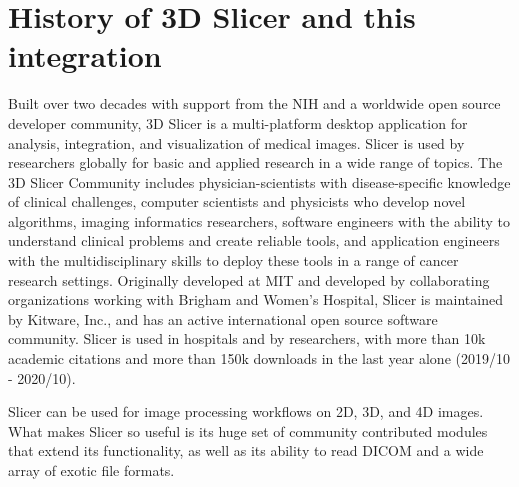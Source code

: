 \documentclass{IEEEcsmag}
\begin{document}
\section{History of 3D Slicer and this integration}

Built over two decades with support from the NIH and a worldwide open source developer community, 3D Slicer is a multi-platform desktop application for analysis, integration, and visualization of medical images. Slicer is used by researchers globally for basic and applied research in a wide range of topics. The 3D Slicer Community includes physician-scientists with disease-specific knowledge of clinical challenges, computer scientists and physicists who develop novel algorithms, imaging informatics researchers, software engineers with the ability to understand clinical problems and create reliable tools, and application engineers with the multidisciplinary skills to deploy these tools in a range of cancer research settings. Originally developed at MIT and developed by collaborating organizations working with Brigham and Women's Hospital, Slicer is maintained by Kitware, Inc., and has an active international open source software community. Slicer is used in hospitals and by researchers, with more than 10k academic citations and more than 150k downloads in the last year alone (2019/10 - 2020/10).

Slicer can be used for image processing workflows on 2D, 3D, and 4D images. What makes Slicer so useful is its huge set of community contributed modules that extend its functionality, as well as its ability to read DICOM and a wide array of exotic file formats.
\end{document}

